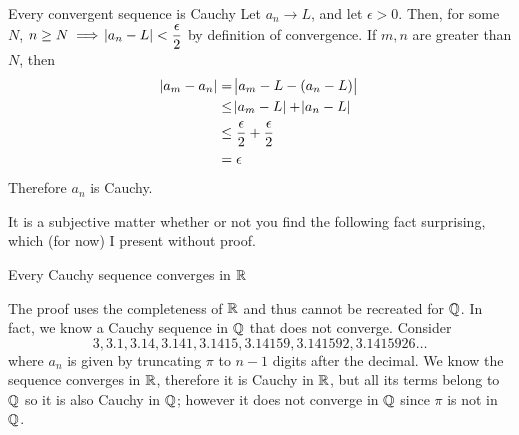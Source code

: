 \begin{SWP}{\thm}{
	Every convergent sequence is Cauchy
}
Let $a_n \rightarrow L$, and let $\epsilon > 0$. Then, for some $N$, $n \geq N \implies \abs{a_n - L} < \dfrac{\epsilon}{2}$ by definition of convergence. If $m, n$ are greater than $N$, then
\begin{align*}
	\abs{a_m - a_n} &= \abs{a_m - L - (a_n - L)} \\
					&\leq \abs{a_m - L} + \abs{a_n - L} \\
					&\leq \dfrac \epsilon 2 + \dfrac \epsilon 2 \\
					&= \epsilon
\end{align*}
Therefore $a_n$ is Cauchy.
\end{SWP}
It is a subjective matter whether or not you find the following fact surprising, which (for now) I present without proof.
\begin{SNP}{\thm}{
	Every Cauchy sequence converges in $\mathbb{R}$
}
\end{SNP}
The proof uses the completeness of $\mathbb{R}$ and thus cannot be recreated for $\mathbb{Q}$. In fact, we know a Cauchy sequence in $\mathbb{Q}$ that does not converge. Consider
$$
3, 3.1, 3.14, 3.141, 3.1415, 3.14159, 3.141592, 3.1415926 \dots
$$
where $a_n$ is given by truncating $\pi$ to $n - 1$ digits after the decimal. We know the sequence converges in $\mathbb{R}$, therefore it is Cauchy in $\mathbb{R}$, but all its terms belong to $\mathbb{Q}$ so it is also Cauchy in $\mathbb{Q}$; however it does not converge in $\mathbb{Q}$ since $\pi$ is not in $\mathbb{Q}$.

